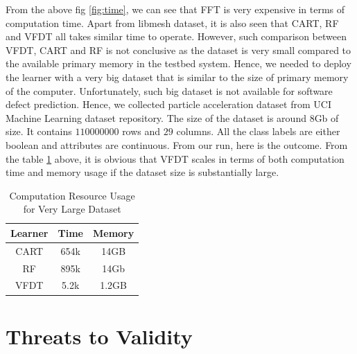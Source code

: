 \documentclass[sigplan]{acmart}\settopmatter{printfolios=true,printccs=false,printacmref=false}
\begin{document}
From the above fig \ref{fig:time}, we can see that FFT is very expensive in terms of computation time. Apart from libmesh dataset, it is also seen that CART, RF and VFDT all takes similar time to operate. However, such comparison between VFDT, CART and RF is not conclusive as the dataset is very small compared to the available primary memory in the testbed system. Hence, we needed to deploy the learner with a very big dataset that is similar to the size of primary memory of the computer. Unfortunately, such big dataset is not available for software defect prediction. Hence, we collected particle acceleration dataset from UCI Machine Learning dataset repository. The size of the dataset is around $8$Gb of size. It contains $110000000$ rows and $29$ columns. All the class labels are either boolean and attributes are continuous. From our run, here is the outcome. From the table \ref{higgs} above, it is obvious that VFDT scales in terms of both computation time and memory usage if the dataset size is substantially large.

\begin{table}
	\begin{tabular}{|c|c|c|}
		\hline 
		\textbf{Learner} & \textbf{Time} & Me\textbf{}mory \\ 
		\hline 
		CART & 654k & 14GB \\ 
		\hline 
		RF & 895k & 14Gb \\ 
		\hline 
		VFDT & 5.2k & 1.2GB \\ 
		\hline 
	\end{tabular}
	\caption{Computation Resource Usage for Very Large Dataset} 
	\label{higgs}
\end{table}

\section{Threats to Validity}







%
%
\end{document}
